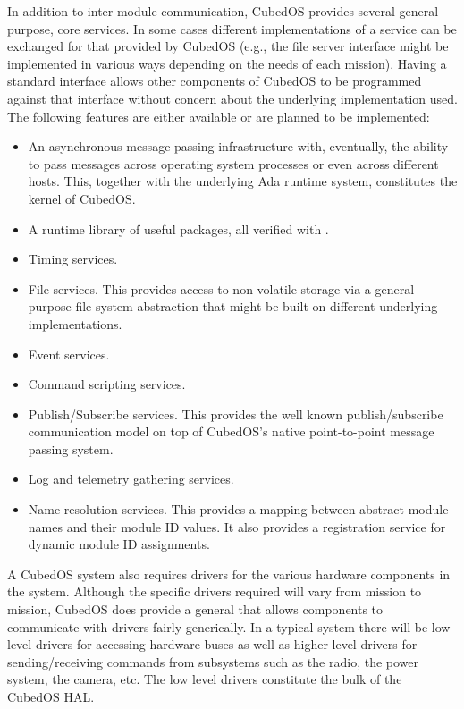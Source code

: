
In addition to inter-module communication, CubedOS provides several general-purpose, core
services. In some cases different implementations of a service can be exchanged for that
provided by CubedOS (e.g., the file server interface might be implemented in various ways
depending on the needs of each mission). Having a standard interface allows other components of
CubedOS to be programmed against that interface without concern about the underlying
implementation used. The following features are either available or are planned to be
implemented:

\begin{itemize}
\item An asynchronous message passing infrastructure with, eventually, the ability to pass
  messages across operating system processes or even across different hosts. This, together with
  the underlying Ada runtime system, constitutes the kernel of CubedOS.
\item A runtime library of useful packages, all verified with \SPARK.
\item Timing services.
\item File services. This provides access to non-volatile storage via a general purpose file
  system abstraction that might be built on different underlying implementations.
\item Event services.
\item Command scripting services.
\item Publish/Subscribe services. This provides the well known publish/subscribe communication
  model on top of CubedOS's native point-to-point message passing system.
\item Log and telemetry gathering services.
\item Name resolution services. This provides a mapping between abstract module names and their
  module ID values. It also provides a registration service for dynamic module ID assignments.
\end{itemize}

A CubedOS system also requires drivers for the various hardware components in the system.
Although the specific drivers required will vary from mission to mission, CubedOS does provide a
general  that allows components to communicate with drivers fairly
generically. In a typical system there will be low level drivers for accessing hardware buses
as well as higher level drivers for sending/receiving commands from subsystems such as the
radio, the power system, the camera, etc. The low level drivers constitute the bulk of the
CubedOS HAL.


